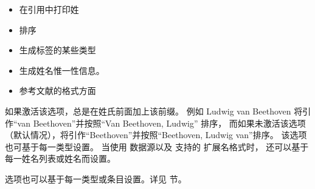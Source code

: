 \begin{optionlist}
\begin{itemize}
\item %
在引用中打印姓
\item %
排序
\item %
生成标签的某些类型
\item %
生成姓名惟一性信息。
\item %
参考文献的格式方面
\end{itemize}
%
如果激活该选项，\biblatex 总是在姓氏前面加上该前缀。
例如 Ludwig van Beethoven 将引作“van Beethoven”并按照“Van Beethoven, Ludwig” 排序，
而如果未激活该选项（默认情况），将引作“Beethoven”并按照“Beethoven, Ludwig van”排序。
该选项也可基于每一类型设置。
当使用 \biblatexml 数据源以及 \biber 支持的 \BibTeX 扩展名格式时，
还可以基于每一姓名列表或姓名而设置。


 选项也可以基于每一类型或条目设置。详见  节。

\end{optionlist}

